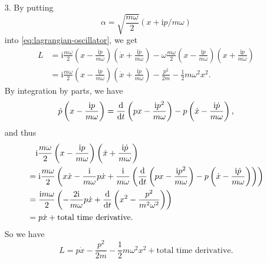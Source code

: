 \documentclass[hyperref, a4paper]{article}
\newcommand*{\ii}{\mathrm{i}}
\begin{document}
\begin{itemize}
\item[3.] By putting 
\begin{equation}
    \alpha = \sqrt{\frac{m \omega}{2}} (x + \ii p / m \omega) 
\end{equation}
into \eqref{eq:lagrangian-oscillator}, we get 
\[
    \begin{aligned}
        L &= \ii \frac{m \omega}{2} \left( x - \frac{\ii p}{m \omega} \right) 
        \left( \dot{x} + \frac{\ii \dot{p}}{m \omega} \right) 
        - \omega \frac{m \omega}{2} \left( x - \frac{\ii p}{m \omega} \right) 
        \left( x + \frac{\ii p}{m \omega} \right) \\
        &= \ii \frac{m \omega}{2} \left( x - \frac{\ii p}{m \omega} \right) 
        \left( \dot{x} + \frac{\ii \dot{p}}{m \omega} \right) 
        - \frac{p^2}{2m} - \frac{1}{2} m \omega^2 x^2.
    \end{aligned}
\]
By integration by parts, we have 
\[
    \dot{p} \left( x - \frac{\ii p}{m \omega} \right) 
    = \dv{t} \left( px - \frac{\ii p^2}{m \omega} \right) 
    - p \left( \dot{x} - \frac{\ii \dot{p}}{m \omega} \right),
\]
and thus 
\[
    \begin{aligned}
        &\quad \ii \frac{m \omega}{2} \left( x - \frac{\ii p}{m \omega} \right) 
        \left( \dot{x} + \frac{\ii \dot{p}}{m \omega} \right) \\
        &= \ii \frac{m \omega}{2} \left( x \dot{x} - \frac{\ii}{m \omega} p \dot{x} + \frac{\ii}{m \omega} \left( \dv{t} \left( px - \frac{\ii p^2}{m \omega} \right) 
        - p \left( \dot{x} - \frac{\ii \dot{p}}{m \omega} \right) \right) \right) \\
        &= \frac{\ii m \omega}{2} \left( - \frac{2 \ii}{m \omega} p \dot{x} + 
        \dv{t} \left( x^2 - \frac{p^2}{m^2 \omega^2} \right) \right) \\
        &= p \dot{x} + \text{total time derivative}.
    \end{aligned}
\]
So we have 
\begin{equation}
    L = p \dot{x} - \frac{p^2}{2m} - \frac{1}{2} m \omega^2 x^2 + \text{total time derivative}.
\end{equation}

\end{itemize}
\end{document}
